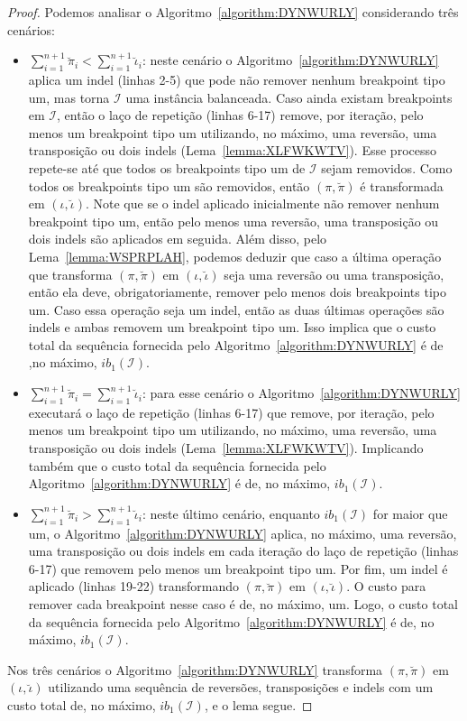 \begin{proof}
  Podemos analisar o Algoritmo~\ref{algorithm:DYNWURLY} considerando três cenários:
  \begin{itemize}
    \item $\sum_{i=1}^{n+1}\breve\pi_i < \sum_{i=1}^{n+1}\breve\iota_i$: neste cenário o Algoritmo~\ref{algorithm:DYNWURLY} aplica um indel (linhas 2-5) que pode não remover nenhum breakpoint tipo um, mas torna $\mathcal{I}$ uma instância balanceada. Caso ainda existam breakpoints em $\mathcal{I}$, então o laço de repetição (linhas 6-17) remove, por iteração, pelo menos um breakpoint tipo um utilizando, no máximo, uma reversão, uma transposição ou dois indels (Lema~\ref{lemma:XLFWKWTV}). Esse processo repete-se até que todos os breakpoints tipo um de $\mathcal{I}$ sejam removidos. Como todos os breakpoints tipo um são removidos, então $(\pi,\breve\pi)$ é transformada em $(\iota,\breve\iota)$. Note que se o indel aplicado inicialmente não remover nenhum breakpoint tipo um, então pelo menos uma reversão, uma transposição ou dois indels são aplicados em seguida. Além disso, pelo Lema~\ref{lemma:WSPRPLAH}, podemos deduzir que caso a última operação que transforma $(\pi,\breve\pi)$ em $(\iota,\breve\iota)$ seja uma reversão ou uma transposição, então ela deve, obrigatoriamente, remover pelo menos dois breakpoints tipo um. Caso essa operação seja um indel, então as duas últimas operações são indels e ambas removem um breakpoint tipo um. Isso implica que o custo total da sequência fornecida pelo Algoritmo~\ref{algorithm:DYNWURLY} é de ,no máximo, $ib_1(\mathcal{I})$.
    \item $\sum_{i=1}^{n+1}\breve\pi_i = \sum_{i=1}^{n+1}\breve\iota_i$: para esse cenário o Algoritmo~\ref{algorithm:DYNWURLY} executará o laço de repetição (linhas 6-17) que remove, por iteração, pelo menos um breakpoint tipo um utilizando, no máximo, uma reversão, uma transposição ou dois indels (Lema~\ref{lemma:XLFWKWTV}). Implicando também que o custo total da sequência fornecida pelo Algoritmo~\ref{algorithm:DYNWURLY} é de, no máximo, $ib_1(\mathcal{I})$.
    \item $\sum_{i=1}^{n+1}\breve\pi_i > \sum_{i=1}^{n+1}\breve\iota_i$: neste último cenário, enquanto $ib_1(\mathcal{I})$ for maior que um, o Algoritmo~\ref{algorithm:DYNWURLY} aplica, no máximo, uma reversão, uma transposição ou dois indels em cada iteração do laço de repetição (linhas 6-17) que removem pelo menos um breakpoint tipo um. Por fim, um indel é aplicado (linhas 19-22) transformando $(\pi,\breve\pi)$ em $(\iota,\breve\iota)$. O custo para remover cada breakpoint nesse caso é de, no máximo, um. Logo, o custo total da sequência fornecida pelo Algoritmo~\ref{algorithm:DYNWURLY} é de, no máximo, $ib_1(\mathcal{I})$. 
  \end{itemize}
  Nos três cenários o Algoritmo~\ref{algorithm:DYNWURLY} transforma $(\pi,\breve\pi)$ em $(\iota,\breve\iota)$ utilizando uma sequência de reversões, transposições e indels com um custo total de, no máximo, $ib_1(\mathcal{I})$, e o lema segue.
\end{proof}

